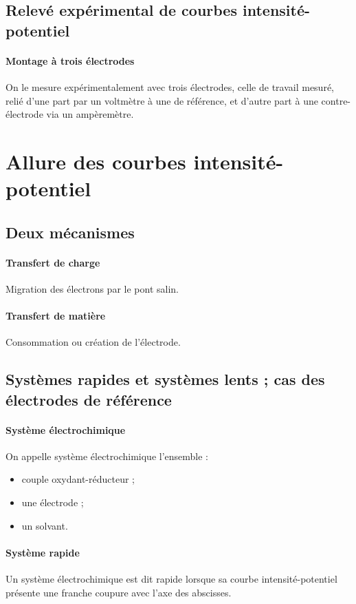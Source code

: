 \documentclass[french]{book}
\theoremstyle{plain}
\theoremstyle{definition}
\theoremstyle{remark}
\begin{document}
\subsection{Relevé expérimental de courbes intensité-potentiel}

\paragraph{Montage à trois électrodes}
On le mesure expérimentalement avec trois électrodes, celle de travail mesuré, relié d’une part par un voltmètre à une de référence, et d’autre part à une contre-électrode via un ampèremètre.

\section{Allure des courbes intensité-potentiel}
\subsection{Deux mécanismes}
\paragraph{Transfert de charge} Migration des électrons par le pont salin.

\paragraph{Transfert de matière} Consommation ou création de l'électrode.

\subsection{Systèmes rapides et systèmes lents ; cas des électrodes de référence}

\paragraph{Système électrochimique} On appelle système électrochimique l'ensemble :
\begin{itemize}
	\item couple oxydant-réducteur ;
	\item une électrode ;
	\item un solvant.
\end{itemize}

\paragraph{Système rapide} Un système électrochimique est dit rapide lorsque sa courbe intensité-potentiel présente une franche coupure avec l'axe des abscisses.
\end{document}
